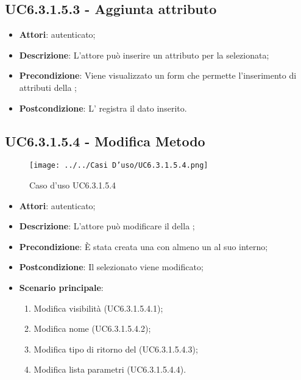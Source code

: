 \subsection{UC6.3.1.5.3 - Aggiunta attributo}
\label{ssec:UC6.3.1.5.3}
\begin{itemize}
\item \textbf{Attori}:  autenticato;
\item \textbf{Descrizione}: L'attore può inserire un attributo per la  selezionata;
\item \textbf{Precondizione}: Viene visualizzato un form che permette l'inserimento di attributi della ;
\item \textbf{Postcondizione}: L' registra il dato inserito.
\end{itemize}
\subsection{UC6.3.1.5.4 - Modifica Metodo}
\label{ssec:UC6.3.1.5.4}
\begin{figure}[h!]
\centering
\texttt{[image: ../../Casi D'uso/UC6.3.1.5.4.png]}
\caption{Caso d'uso UC6.3.1.5.4}
 \end{figure}
\begin{itemize}
\item \textbf{Attori}:  autenticato;
\item \textbf{Descrizione}: L'attore può modificare il  della ;
\item \textbf{Precondizione}: È stata creata una  con almeno un  al suo interno;
\item \textbf{Postcondizione}: Il  selezionato viene modificato;
\item \textbf{Scenario principale}: \begin{enumerate}\item Modifica visibilità  (UC6.3.1.5.4.1);\item Modifica nome  (UC6.3.1.5.4.2);\item Modifica tipo di ritorno del  (UC6.3.1.5.4.3);\item Modifica lista parametri  (UC6.3.1.5.4.4).
 \end{enumerate}
\end{itemize}
